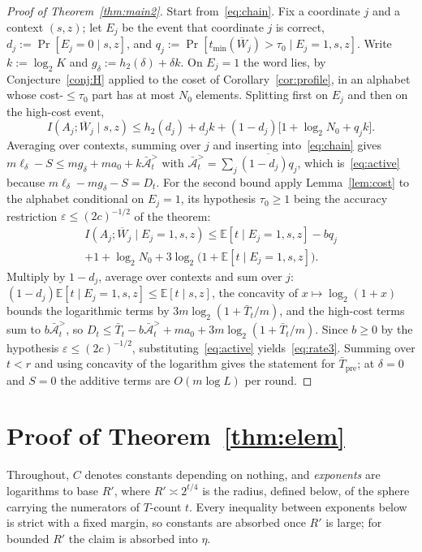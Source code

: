 \documentclass[aps,prx,twocolumn,superscriptaddress,nofootinbib,longbibliography]{revtex4-2}
\theoremstyle{plain}
\theoremstyle{definition}
\theoremstyle{remark}
\newcommand{\Tpre}{T_{\mathrm{pre}}}
\newcommand{\E}{\mathbb{E}}
\begin{document}
\begin{proof}[Proof of Theorem~\ref{thm:main2}]
Start from~\eqref{eq:chain}. Fix a coordinate $j$ and a context $(s,z)$; let $E_j$ be the event that coordinate $j$ is correct, $d_j:=\Pr[E_j=0\mid s,z]$, and $q_j:=\Pr[t_{\min}(\overline W_j)>\tau_0\mid E_j=1,s,z]$. Write $k:=\log_2K$ and $g_\delta:=h_2(\delta)+\delta k$. On $E_j=1$ the word lies, by Conjecture~\ref{conj:H} applied to the coset of Corollary~\ref{cor:profile}, in an alphabet whose cost-$\le\tau_0$ part has at most $N_0$ elements. Splitting first on $E_j$ and then on the high-cost event,
\[
I(A_j;\overline W_j\mid s,z)\le h_2(d_j)+d_jk+(1-d_j)\big[1+\log_2N_0+q_jk\big].
\]
Averaging over contexts, summing over $j$ and inserting into~\eqref{eq:chain} gives $m\ell_\delta-S\le mg_\delta+ma_0+k\bar{\mathcal A}^{>}_t$ with $\bar{\mathcal A}^{>}_t=\sum_j\overline{(1-d_j)q_j}$, which is~\eqref{eq:active} because $m\ell_\delta-mg_\delta-S=D_t$. For the second bound apply Lemma~\ref{lem:cost} to the alphabet conditional on $E_j=1$, its hypothesis $\tau_0\ge1$ being the accuracy restriction $\varepsilon\le(2c)^{-1/2}$ of the theorem:
\begin{multline*}
I(A_j;\overline W_j\mid E_j=1,s,z)\le\E[t\mid E_j=1,s,z]-bq_j\\+1+\log_2N_0+3\log_2\big(1+\E[t\mid E_j=1,s,z]\big).
\end{multline*}
Multiply by $1-d_j$, average over contexts and sum over $j$: $(1-d_j)\E[t\mid E_j=1,s,z]\le\E[t\mid s,z]$, the concavity of $x\mapsto\log_2(1+x)$ bounds the logarithmic terms by $3m\log_2(1+\bar T_t/m)$, and the high-cost terms sum to $b\bar{\mathcal A}^{>}_t$, so $D_t\le\bar T_t-b\bar{\mathcal A}^{>}_t+ma_0+3m\log_2(1+\bar T_t/m)$. Since $b\ge0$ by the hypothesis $\varepsilon\le(2c)^{-1/2}$, substituting~\eqref{eq:active} yields~\eqref{eq:rate3}. Summing over $t<r$ and using concavity of the logarithm gives the statement for $\bar\Tpre$; at $\delta=0$ and $S=0$ the additive terms are $O(m\log L)$ per round.
\end{proof}

\section{Proof of Theorem~\ref{thm:elem}}\label{app:elem}

Throughout, $C$ denotes constants depending on nothing, and \emph{exponents} are logarithms to base $R'$, where $R'\asymp2^{t/4}$ is the radius, defined below, of the sphere carrying the numerators of $T$-count $t$. Every inequality between exponents below is strict with a fixed margin, so constants are absorbed once $R'$ is large; for bounded $R'$ the claim is absorbed into $\eta$.
\end{document}

